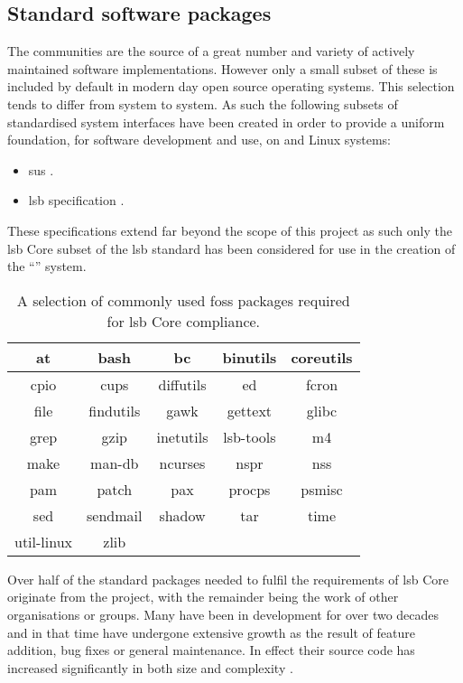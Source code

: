 \subsection{Standard software packages}

The  communities are the source of a great number and variety of actively maintained software implementations. However only a small subset of these is included by default in modern day open source operating systems. This selection tends to differ from system to system. As such the following subsets of standardised system interfaces have been created in order to provide a uniform foundation, for software development and use, on  and Linux systems:

\begin{itemize}
    \item \gls{sus} \cite{susv4}.
    \item \gls{lsb} specification \cite{lsb}.
\end{itemize}

These specifications extend far beyond the scope of this project as such only the \gls{lsb} Core subset of the \gls{lsb} standard has been considered for use in the creation of the \enquote{} system.

\begin{table}[H]
    \centering
    \begin{tabular}{|c|c|c|c|c|}
        \hline
        at & bash & bc & binutils & coreutils \\
        \hline
        cpio & cups & diffutils & ed & fcron \\
        \hline
        file & findutils & gawk & gettext & glibc \\
        \hline
        grep & gzip & inetutils & lsb-tools & m4 \\
        \hline
        make & man-db & ncurses & nspr & nss \\
        \hline
        pam & patch & pax & procps & psmisc \\
        \hline
        sed & sendmail & shadow & tar & time \\
        \hline
        util-linux & zlib \\
        \cline{1-2}
    \end{tabular}
    \caption{A selection of commonly used \gls{foss} packages required for \gls{lsb} Core compliance.}
    \label{table:LSB Core}
\end{table}

Over half of the standard packages needed to fulfil the requirements of \gls{lsb} Core originate from the  project, with the remainder being the work of other organisations or groups. Many have been in development for over two decades and in that time have undergone extensive growth as the result of feature addition, bug fixes or general maintenance. In effect their source code has increased significantly in both size and complexity \cite{Succi2001PreliminaryRF,Quach2018DebloatingST,Quach2019BloatFA}.

